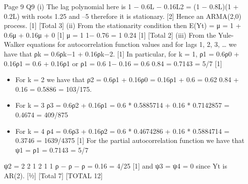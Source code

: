 \documentclass[a4paper,12pt]{article}
\begin{document}
  Page 9
  Q9 (i) The lag polynomial here is 1 − 0.6L − 0.16L2 = (1 − 0.8L)(1 + 0.2L) with roots
  1.25 and –5 therefore it is stationary. [2]
  Hence an ARMA(2,0) process. [1]
  [Total 3]
  (ii) From the stationarity condition then
  E(Yt) = μ = 1 + 0.6μ + 0.16μ + 0 [1]
  μ = 1
  1− 0.76
  = 1
  0.24
  [1]
  [Total 2]
  (iii) From the Yule-Walker equations for autocorrelation function values and for
  lags 1, 2, 3, … we have that ρk = 0.6ρk−1 + 0.16ρk−2. [1]
  In particular, for k = 1,
  ρ1 = 0.6ρ0 + 0.16ρ1 = 0.6 + 0.16ρ1
  or ρ1 =
    0.6
  1− 0.16 =
    0.6
  0.84 = 0.7143 = 5/7 [1]
  \begin{itemize}
\item  For k = 2 we have that
  ρ2 = 0.6ρ1 + 0.16ρ0 = 0.16ρ1 + 0.6 =
    0.62
  0.84 + 0.16
  = 0.5886 = 103/175. 
\item  For k = 3
  ρ3 = 0.6ρ2 + 0.16ρ1 = 0.6 * 0.5885714 + 0.16 * 0.7142857
  = 0.4674 = 409/875 
\item  For k = 4
  ρ4 = 0.6ρ3 + 0.16ρ2 = 0.6 * 0.4674286 + 0.16 * 0.5884714
  = 0.3746 = 1639/4375 [1]
  For the partial autocorrelation function we have that
  ψ1 = ρ1 = 0.7143 = 5/7 
\end{itemize}  
  ψ2 =
    2
  2 1
  2
  1 1
  ρ − ρ
  − ρ
  = 0.16 = 4/25 [1]
  and ψ3 = ψ4 = 0 since Yt is AR(2). [½]
  [Total 7]
  [TOTAL 12]
  
\end{document}
